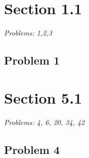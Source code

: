 \documentclass[12pt]{article}
\begin{document}

\section*{Section 1.1}
\textit{Problems: 1,2,3 }

\subsection*{Problem 1}

\vspace*{1cm}


\section*{Section 5.1}
\textit{Problems: 4, 6, 20, 34, 42}

\subsection*{Problem 4}
\end{document}
